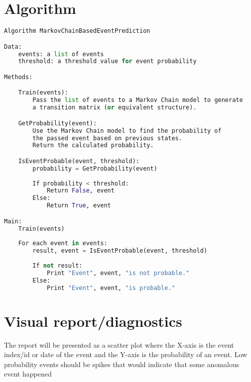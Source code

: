 \documentclass{VUMIFPSmagistrinis}
\begin{document}
\section{Algorithm}
    \begin{lstlisting}[language=Python]
Algorithm MarkovChainBasedEventPrediction

Data:
    events: a list of events
    threshold: a threshold value for event probability

Methods:

    Train(events):
        Pass the list of events to a Markov Chain model to generate 
        a transition matrix (or equivalent structure).

    GetProbability(event):
        Use the Markov Chain model to find the probability of 
        the passed event based on previous states.
        Return the calculated probability.

    IsEventProbable(event, threshold):
        probability = GetProbability(event)
        
        If probability < threshold:
            Return False, event
        Else:
            Return True, event

Main:
    Train(events)
    
    For each event in events:
        result, event = IsEventProbable(event, threshold)
        
        If not result:
            Print "Event", event, "is not probable."
        Else:
            Print "Event", event, "is probable."

\end{lstlisting}


\section{Visual report/diagnostics}
    The report will be presented as a scatter plot where the X-axis is the event index/id or date of the event and the Y-axis is the probability of an event.
    Low probability events should be spikes that would indicate that some anomalous event happened

		
\pagebreak
\printbibliography[heading=bibintoc] 
\end{document}

